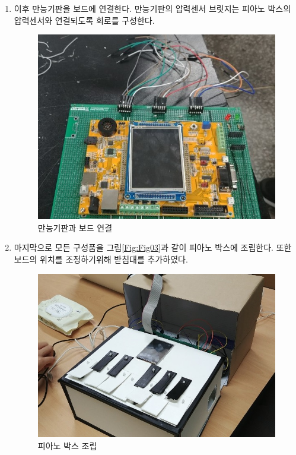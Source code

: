 \documentclass[a4paper,11pt]{article}
\begin{document}
\begin{spacing}{1.6}
\begin{enumerate}
\item 이후 만능기판을 보드에 연결한다. 만능기판의 압력센서 브릿지는 피아노 박스의 압력센서와 연결되도록 회로를 구성한다.
\begin{figure}[hbt!]
\centering
\includegraphics[scale=0.5]{2.jpg}
\caption{만능기판과 보드 연결}
\label{Fig:Fig05}
\end{figure}

\item 마지막으로  모든 구성품을 그림\ref{Fig:Fig03}과 같이 피아노 박스에 조립한다. 또한 보드의 위치를 조정하기위해 받침대를 추가하였다.
\begin{figure}[hbt!]
\centering
\includegraphics[scale=0.5]{3.jpg}
\caption{피아노 박스 조립}
\label{Fig:Fig06}
\end{figure}
\end{enumerate}


\end{spacing}
\end{document}
